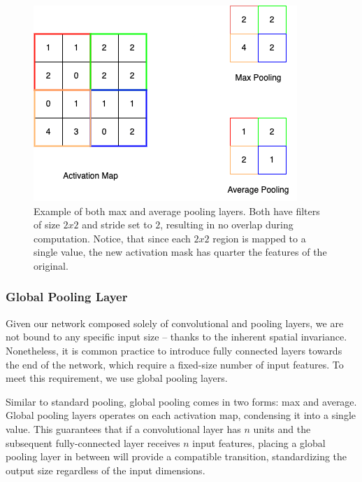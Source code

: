\begin{figure}[!h]
    \begin{center}
    \begin{minipage}{0.5\textwidth}
      \includegraphics[width=\textwidth]{img/cnn-pool.png}
    \end{minipage}
    \caption{Example of both max and average pooling layers. Both have filters of size $2x2$ and stride set to $2$, resulting in no overlap during computation. Notice, that since each $2x2$ region is mapped to a single value, the new activation mask has quarter the features of the original.}
    \label{fig:cnn-pooling}
    \end{center}
\end{figure}

\subsubsection{Global Pooling Layer}

Given our network composed solely of convolutional and pooling layers, we are not bound to any specific input size -- thanks to the inherent spatial invariance. Nonetheless, it is common practice to introduce fully connected layers towards the end of the network, which require a fixed-size number of input features. To meet this requirement, we use global pooling layers.

Similar to standard pooling, global pooling comes in two forms: max and average. Global pooling layers operates on each activation map, condensing it into a single value. This guarantees that if a convolutional layer has $n$ units and the subsequent fully-connected layer receives $n$ input features, placing a global pooling layer in between will provide a compatible transition, standardizing the output size regardless of the input dimensions.
